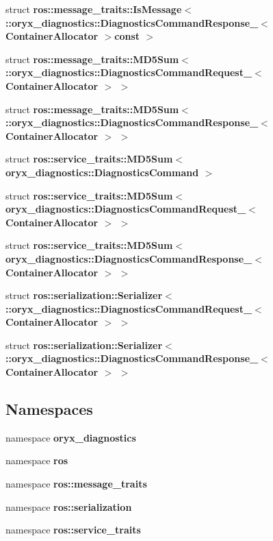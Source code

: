 \begin{DoxyCompactItemize}
\item 
struct {\bf ros\-::message\-\_\-traits\-::\-Is\-Message$<$ \-::oryx\-\_\-diagnostics\-::\-Diagnostics\-Command\-Response\-\_\-$<$ Container\-Allocator $>$const  $>$}
\item 
struct {\bf ros\-::message\-\_\-traits\-::\-M\-D5\-Sum$<$ \-::oryx\-\_\-diagnostics\-::\-Diagnostics\-Command\-Request\-\_\-$<$ Container\-Allocator $>$ $>$}
\item 
struct {\bf ros\-::message\-\_\-traits\-::\-M\-D5\-Sum$<$ \-::oryx\-\_\-diagnostics\-::\-Diagnostics\-Command\-Response\-\_\-$<$ Container\-Allocator $>$ $>$}
\item 
struct {\bf ros\-::service\-\_\-traits\-::\-M\-D5\-Sum$<$ oryx\-\_\-diagnostics\-::\-Diagnostics\-Command $>$}
\item 
struct {\bf ros\-::service\-\_\-traits\-::\-M\-D5\-Sum$<$ oryx\-\_\-diagnostics\-::\-Diagnostics\-Command\-Request\-\_\-$<$ Container\-Allocator $>$ $>$}
\item 
struct {\bf ros\-::service\-\_\-traits\-::\-M\-D5\-Sum$<$ oryx\-\_\-diagnostics\-::\-Diagnostics\-Command\-Response\-\_\-$<$ Container\-Allocator $>$ $>$}
\item 
struct {\bf ros\-::serialization\-::\-Serializer$<$ \-::oryx\-\_\-diagnostics\-::\-Diagnostics\-Command\-Request\-\_\-$<$ Container\-Allocator $>$ $>$}
\item 
struct {\bf ros\-::serialization\-::\-Serializer$<$ \-::oryx\-\_\-diagnostics\-::\-Diagnostics\-Command\-Response\-\_\-$<$ Container\-Allocator $>$ $>$}
\end{DoxyCompactItemize}
\subsection*{\-Namespaces}
\begin{DoxyCompactItemize}
\item 
namespace {\bf oryx\-\_\-diagnostics}
\item 
namespace {\bf ros}
\item 
namespace {\bf ros\-::message\-\_\-traits}
\item 
namespace {\bf ros\-::serialization}
\item 
namespace {\bf ros\-::service\-\_\-traits}
\end{DoxyCompactItemize}
